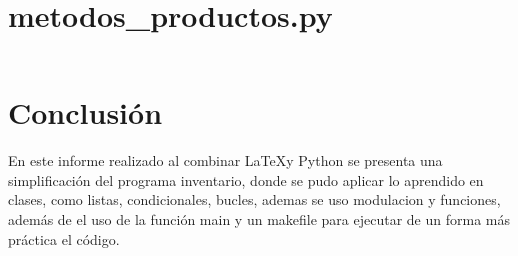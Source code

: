 \documentclass[12pt]{article}
\begin{document}
\section{metodos\_productos.py}
\inputminted[fontsize=\small, breaklines=true]{python}{Codigo/metodos_productos.py}

\section{Conclusión}

En este informe realizado al combinar \LaTeX y Python se presenta una simplificación del programa inventario, donde se pudo aplicar lo aprendido en clases, como listas, condicionales, bucles, ademas se uso modulacion y funciones, además de el uso de la función main y un makefile para ejecutar de un forma más práctica el código.
\end{document}

